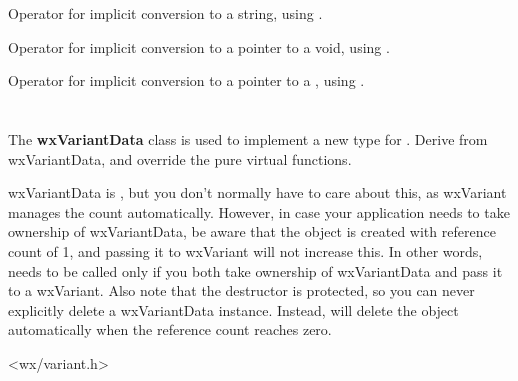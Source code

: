 Operator for implicit conversion to a string, using .

\label{wxvariantvoid}


Operator for implicit conversion to a pointer to a void, using .

\label{wxvariantdatetime}


Operator for implicit conversion to a pointer to a , using .





\section{}\label{wxvariantdata}

The {\bf wxVariantData} class is used to implement a new type for . 
Derive from wxVariantData, and override the pure virtual functions.

wxVariantData is , but you don't normally have to care about this, 
as wxVariant manages the count automatically. However, in case your application needs to take
ownership of wxVariantData, be aware that the object is created with reference count of 1,
and passing it to wxVariant will not increase this. In other words, 
needs to be called only if you both take ownership of wxVariantData and pass it to a wxVariant.
Also note that the destructor is protected, so you can never explicitly delete a wxVariantData
instance. Instead,  will delete the object automatically
when the reference count reaches zero.




<wx/variant.h>




